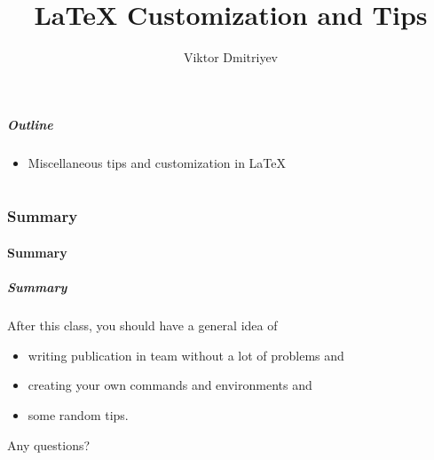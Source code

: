 \documentclass[slidestop,compress,mathserif]{beamer}
\title{LaTeX Customization and Tips}
\subtitle{}
\author{Viktor Dmitriyev}
\institute{Adapted from Mini Course on LaTeX by \href{https://github.com/OpenIntroOrg/mini-course-materials}{David Diez}}
\date{}
\begin{document}
\newenvironment{act}[1]{{\color{command}#1}}{}
\newcommand{\lcom}[1]{{\color{command}$\backslash$#1}}
\newcommand{\larg}[1]{{\color{braces}$\{${\color{black}#1}$\}$}}
\newcommand{\mathText}[1]{{\color{braces}\${\color{black}#1}\$}}


\frame{ \titlepage }

\begin{frame}
  \frametitle{Outline}
  \begin{itemize}
	  \item Miscellaneous tips and customization in LaTeX
  \end{itemize}
\end{frame}

\part{}



\section[Summary]{Summary}
\subsection[Summary]{Summary}

\begin{frame}  \frametitle{Summary}
After this class, you should have a general idea of
\vspace{1mm} \\
	\begin{itemize}
		\item writing publication in team without a lot of problems and 
		\item creating your own commands and environments and 
		\item some random tips.
	\end{itemize}
\vspace{1mm}
Any questions?
\end{frame}
\end{document}
